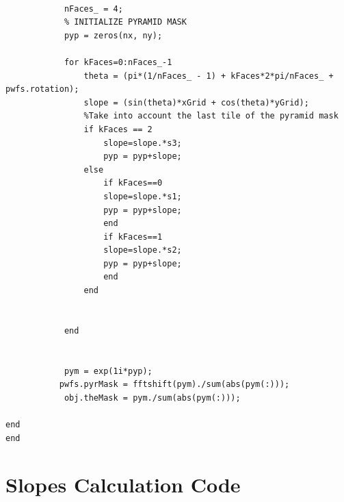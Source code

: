 \begin{lstlisting}
            
            nFaces_ = 4;            
            % INITIALIZE PYRAMID MASK
            pyp = zeros(nx, ny);

            for kFaces=0:nFaces_-1
                theta = (pi*(1/nFaces_ - 1) + kFaces*2*pi/nFaces_ + pwfs.rotation);
                slope = (sin(theta)*xGrid + cos(theta)*yGrid);
                %Take into account the last tile of the pyramid mask
                if kFaces == 2
                    slope=slope.*s3; 
                    pyp = pyp+slope;
                else
                    if kFaces==0
                    slope=slope.*s1;
                    pyp = pyp+slope;
                    end
                    if kFaces==1
                    slope=slope.*s2;
                    pyp = pyp+slope;
                    end
                end


            end
                
  
            pym = exp(1i*pyp);
           pwfs.pyrMask = fftshift(pym)./sum(abs(pym(:)));
            obj.theMask = pym./sum(abs(pym(:)));    
      
end
end

\end{lstlisting}

\section{Slopes Calculation Code}\label{slopescode}

